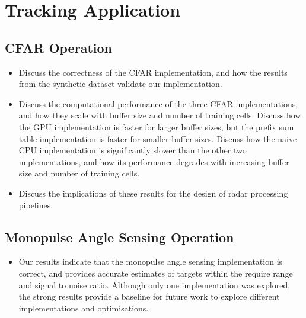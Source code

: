\section{Tracking Application}

\subsection{CFAR Operation}
\begin{itemize}
    \item Discuss the correctness of the CFAR implementation, and how the results from the synthetic dataset validate our implementation.
    \item Discuss the computational performance of the three CFAR implementations, and how they scale with buffer size and number of training cells. Discuss how the GPU implementation is faster for larger buffer sizes, but the prefix sum table implementation is faster for smaller buffer sizes. Discuss how the naive CPU implementation is significantly slower than the other two implementations, and how its performance degrades with increasing buffer size and number of training cells. 
    \item Discuss the implications of these results for the design of radar processing pipelines.
\end{itemize}


\subsection{Monopulse Angle Sensing Operation}
\begin{itemize}
    \item Our results indicate that the monopulse angle sensing implementation is correct, and provides accurate estimates of targets within the require range and signal to noise ratio. Although only one implementation was explored, the strong results provide a baseline for future work to explore different implementations and optimisations.  
\end{itemize}